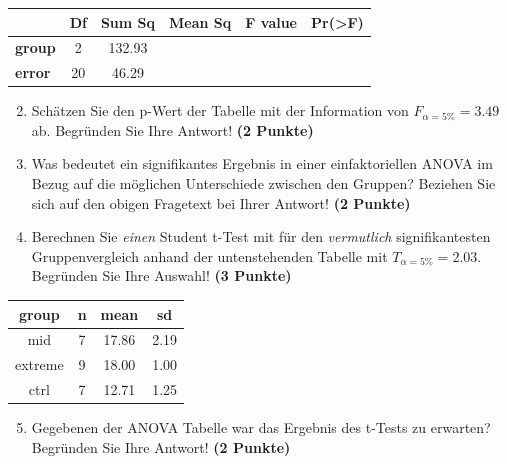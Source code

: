 \documentclass[a4paper, 9pt]{scrartcl}\usepackage[]{graphicx}\usepackage[]{xcolor}
\newenvironment{knitrout}{}{} %
\begin{document}
\vspace{1Ex}

\begin{center}
  \Large
  \begin{tabular}{l|c|c|c|c|c}
     & \textbf{Df} & \textbf{Sum Sq} & \textbf{Mean Sq} & \textbf{F value} & \textbf{Pr(>F)} \strut\\
    \hline
   \textbf{group}  & 2 & 132.93 &  &  &  \strut\\
    \hline
   \textbf{error}  & 20 & 46.29 &  &  &  \strut\\
  \end{tabular}
\end{center}

\vspace{1Ex}

\begin{enumerate}
  \setcounter{enumi}{1}
\item Sch{\"a}tzen Sie den p-Wert der Tabelle mit der Information von
  $F_{\alpha = 5\%} = 3.49$ ab. Begr{\"u}nden Sie Ihre
  Antwort! \textbf{(2 Punkte)}
\item Was bedeutet ein signifikantes Ergebnis in einer einfaktoriellen
  ANOVA im Bezug auf die m{\"o}glichen Unterschiede zwischen den Gruppen?
  Beziehen Sie sich auf den obigen Fragetext bei Ihrer Antwort!  \textbf{(2
    Punkte)}
\item Berechnen Sie \textit{einen} Student t-Test mit f{\"u}r den \textit{vermutlich}
  signifikantesten Gruppenvergleich anhand der untenstehenden Tabelle mit
  $T_{\alpha = 5\%} = 2.03$. Begr{\"u}nden Sie Ihre Auswahl! \textbf{(3 Punkte)}
\end{enumerate}

\begin{knitrout}
\color{fgcolor}\begin{table}[!h]
\centering
\begin{tabular}{cccc}
\toprule
group & n & mean & sd\\
\midrule
mid & 7 & 17.86 & 2.19\\
extreme & 9 & 18.00 & 1.00\\
ctrl & 7 & 12.71 & 1.25\\
\bottomrule
\end{tabular}
\end{table}

\end{knitrout}

\begin{enumerate}
  \setcounter{enumi}{4}
\item Gegebenen der ANOVA Tabelle war das Ergebnis des t-Tests zu erwarten?
  Begr{\"u}nden Sie Ihre Antwort! \textbf{(2 Punkte)}
\end{enumerate}
\end{document}
